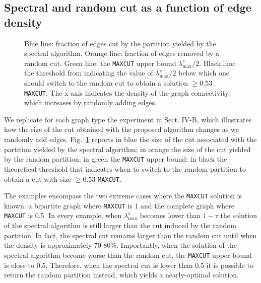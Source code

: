 \documentclass[journal]{IEEEtran}
\newcommand{\maxcut}{\texttt{\small{MAXCUT}}}
\begin{document}
    
\subsection{Spectral and random cut as a function of edge density}

\begin{figure}[!ht]
    \centering
    

    \caption{Blue line: fraction of edges cut by the partition yielded by the spectral algorithm. 
    Orange line: fraction of edges removed by a random cut. 
    Green line: the \maxcut{} upper bound $\lambda^s_\text{max}/2$. 
    Black line: the threshold from \cite{trevisan2012max} indicating the value of $\lambda^s_\text{max}/2$ below which one should switch to the random cut to obtain a solution $\geq 0.53$ \maxcut{}. 
    The x-axis indicates the density of the graph connectivity, which increases by randomly adding edges.}
    \label{fig:adding_edges2}
\end{figure}

We replicate for each graph type the experiment in Sect. IV-B, which illustrates how the size of the cut obtained with the proposed algorithm changes as we randomly add edges.
Fig.~\ref{fig:adding_edges2} reports in blue the size of the cut associated with the partition yielded by the spectral algorithm; in orange the size of the cut yielded by the random partition; in green the \maxcut{} upper bound; in black the theoretical threshold that indicates when to switch to the random partition to obtain a cut with size $\geq 0.53$ \maxcut{}.

The examples encompass the two extreme cases where the \maxcut{} solution is known: a bipartite graph where \maxcut{} is 1 and the complete graph where \maxcut{} is 0.5.
In every example, when $\lambda^s_\text{max}$ becomes lower than $1-\tau$ the solution of the spectral algorithm is still larger than the cut induced by the random partition.
In fact, the spectral cut remains larger than the random cut until when the density is approximately 70-80\%.
Importantly, when the solution of the spectral algorithm become worse than the random cut, the \maxcut{} upper bound is close to 0.5.
Therefore, when the spectral cut is lower than 0.5 it is possible to return the random partition instead, which yields a nearly-optimal solution.
\end{document}
